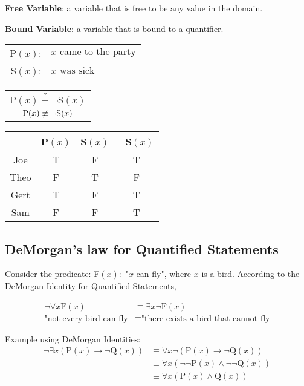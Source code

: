 \noindent \textbf{Free Variable}: a variable that is free to be any value in the domain.

\noindent \textbf{Bound Variable}: a variable that is bound to a quantifier.

\begin{center}
  \begin{tabular}{rl}
    \(\text{P}(x)\): & \(x \text{ came to the party}\) \\
    \(\text{S}(x)\): & \(x \text{ was sick}\)          \\
  \end{tabular}
  \qquad
  \begin{tabular}{c}
    \(\text{P}(x) \overset{?}{\equiv} \lnot \text{S}(x)\) \\
    \(\text{P}(x) \centernot{\equiv} \lnot \text{S}(x)\)
  \end{tabular}
  \qquad
  \begin{tabular}{c|ccc}
         & P\((x)\) & S\((x)\) & \(\lnot\)S\((x)\) \\
    \hline
    Joe  & T        & F        & T                 \\
    Theo & F        & T        & F                 \\
    Gert & T        & F        & T                 \\
    Sam  & F        & F        & T
  \end{tabular}
\end{center}

\subsection{DeMorgan's law for Quantified Statements}


Consider the predicate: F\((x):\) "\(x\) can fly", where \(x\) is a bird.
According to the DeMorgan Identity for Quantified Statements,

\begin{align*}
  \lnot \forall x \text{F}(x)    & \equiv \exists x \lnot \text{F}(x)                 \\
  \text{"not every bird can fly} & \equiv \text{"there exists a bird that cannot fly}
\end{align*}

Example using DeMorgan Identities:
\begin{align*}
  \lnot \exists x (\text{P}(x) \rightarrow \lnot \text{Q}(x)) & \equiv \forall x \lnot (\text{P}(x) \rightarrow \lnot \text{Q}(x))       \\
                                                              & \equiv \forall x (\lnot \lnot \text{P}(x) \land \lnot \lnot \text{Q}(x)) \\
                                                              & \equiv \forall x (\text{P}(x) \land \text{Q}(x))
\end{align*}

